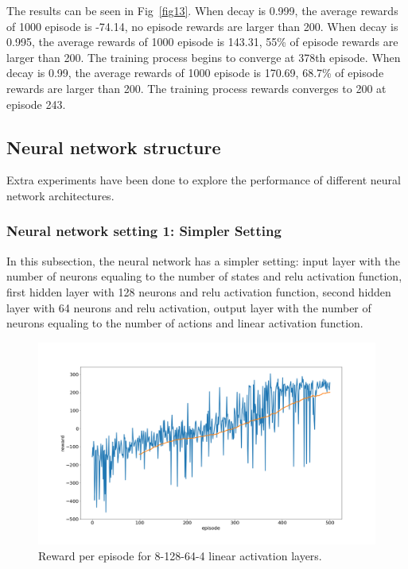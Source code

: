\documentclass[conference]{IEEEtran}
\begin{document}
The results can be seen in Fig~\ref{fig13}. When decay is 0.999, the average rewards of 1000 episode is -74.14, no episode rewards are larger than 200. When decay is 0.995, the average rewards of 1000 episode is 143.31, 55\% of episode rewards are larger than 200. The training process begins to converge at 378th episode. When decay is 0.99, the average rewards of 1000 episode is 170.69, 68.7\% of episode rewards are larger than 200. The training process rewards converges to 200 at episode 243. 

\subsection{Neural network structure}\label{sec:network}

Extra experiments have been done to explore the performance of different neural network architectures.

\subsubsection{Neural network setting 1: Simpler Setting}\label{sec:simple}

In this subsection, the neural network has a simpler setting: input layer with the number of neurons equaling to the number of states and relu activation function, first hidden layer with 128 neurons and relu activation function, second hidden layer with 64 neurons and relu activation, output layer with the number of neurons equaling to the number of actions and linear activation function.

\begin{figure}[htbp]
\includegraphics[width=\linewidth]{train_simple.png}
\caption{Reward per episode for 8-128-64-4 linear activation layers.}
\label{fig14}
\end{figure}
\end{document}
